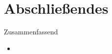 \section{Abschließendes}
{\SummaryFrame
\begin{frame}[fragile,t]{Zusammenfassend}
{}
\vfill\vfill %
\begin{itemize}[<+(1)->]
    \itemsep8pt
    \item
\end{itemize}
\end{frame}
}


\iffull\fi

